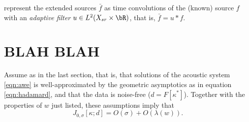 \cite{Warner:16} represent the extended sources $\bar{f}$ as time convolutions of the
(known) source $f$ with an {\em adaptive filter} $u \in L^2(X_{sr}
\times \bR)$, that is, $\bar{f}=u * f$.


\section{BLAH BLAH}


Assume as in the last section, that is, that solutions
of the acoustic system \ref{eqn:awe} is well-approximated by the
geometric asymptotics as in equation \ref{eqn:hadamard}, and that the
data is noise-free ($d=F[\kappa^*]$). Together with the properties of $w$
just listed, these assumptions imply that
\begin{equation}
  \label{eqn:eq11}
  J_{0,\sigma}[\kappa;d] = O(\sigma) + O(\lambda(w)).
\end{equation}


